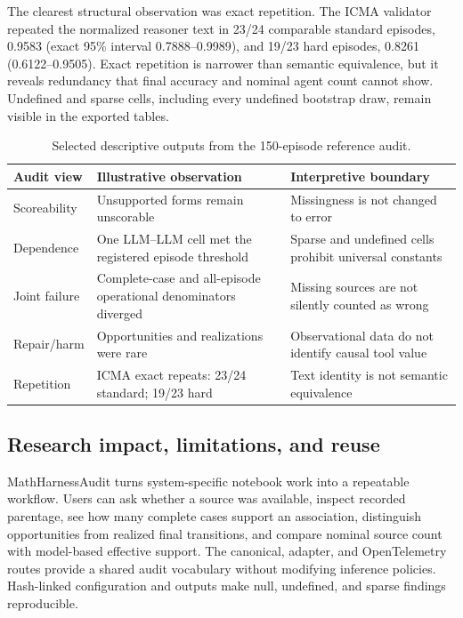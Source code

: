 \documentclass[preprint,12pt,a4paper]{elsarticle}
\begin{document}
The clearest structural observation was exact repetition. The ICMA validator
repeated the normalized reasoner text in 23/24 comparable standard episodes,
0.9583 (exact 95\% interval 0.7888--0.9989), and 19/23 hard episodes, 0.8261
(0.6122--0.9505). Exact repetition is narrower than semantic equivalence, but it
reveals redundancy that final accuracy and nominal agent count cannot show.
Undefined and sparse cells, including every undefined bootstrap draw, remain
visible in the exported tables.

\begin{table}[!ht]
\centering
\small
\begin{tabularx}{\textwidth}{@{}L{3.2cm}L{3.8cm}Y@{}}
\toprule
\textbf{Audit view} & \textbf{Illustrative observation} & \textbf{Interpretive boundary} \\
\midrule
Scoreability & Unsupported forms remain unscorable & Missingness is not changed
to error \\
Dependence & One LLM--LLM cell met the registered episode threshold & Sparse and
undefined cells prohibit universal constants \\
Joint failure & Complete-case and all-episode operational denominators diverged &
Missing sources are not silently counted as wrong \\
Repair/harm & Opportunities and realizations were rare & Observational data do
not identify causal tool value \\
Repetition & ICMA exact repeats: 23/24 standard; 19/23 hard & Text identity is not
semantic equivalence \\
\bottomrule
\end{tabularx}
\caption{Selected descriptive outputs from the 150-episode reference audit.}
\label{tab:audit}
\end{table}

\subsection{Research impact, limitations, and reuse}

MathHarnessAudit turns system-specific notebook work into a repeatable workflow.
Users can ask whether a source was available, inspect recorded parentage, see
how many complete cases support an association, distinguish opportunities from
realized final transitions, and compare nominal source count with model-based
effective support. The canonical, adapter, and OpenTelemetry routes provide a
shared audit vocabulary without modifying inference policies. Hash-linked
configuration and outputs make null, undefined, and sparse findings reproducible.
\end{document}

